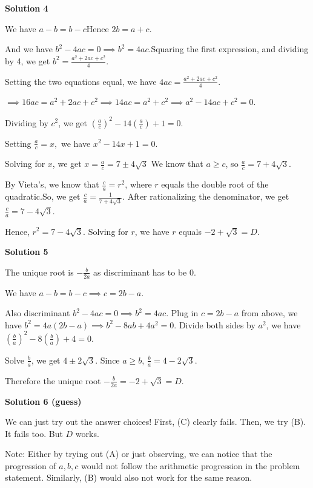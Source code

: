 \begin{enumerate}
\textbf{Solution 4}

We have $a-b=b-c$Hence $2b=a+c$.

 And we have $b^2-4ac=0\implies b^2=4ac$.Squaring the first expression, and dividing by 4, we get $b^2=\frac{a^2+2ac+c^2}{4}$.

 Setting the two equations equal, we have $4ac=\frac{a^2+2ac+c^2}{4}$.

 $\implies 16ac=a^2+2ac+c^2\implies 14ac=a^2+c^2\implies a^2-14ac+c^2=0$.

 Dividing by $c^2$, we get $(\frac{a}{c})^2-14(\frac{a}{c})+1=0$. 

 Setting $\frac{a}{c}=x,$ we have $x^2-14x+1=0.$ 

 Solving for $x$, we get $x=\frac{a}{c}=7 \pm 4\sqrt3$ We know that $a \ge c$, so $\frac{a}{c}=7+4\sqrt3$.

 By Vieta's, we know that $\frac{c}{a}=r^2$, where $r$ equals the double root of the quadratic.So, we get $\frac{c}{a}=\frac{1}{7 + 4\sqrt3}$. After rationalizing the denominator, we get $\frac{c}{a} = 7- 4\sqrt 3$.

 Hence, $r^2=7-4\sqrt3$. Solving for $r$, we have $r$ equals $-2+\sqrt3=\boxed{D}$.

 



\textbf{Solution 5}

The unique root is $-\frac {b} {2a}$ as discriminant has to be 0.

 We have $a-b=b-c \implies c=2b-a$.

 Also discriminant $b^2-4ac=0 \implies b^2=4ac$. Plug in $c=2b-a$ from above, we have $b^2=4a(2b-a) \implies b^2-8ab+4a^2=0$. Divide both sides by $a^2$,  we have $(\frac{b}{a})^2-8(\frac{b}{a})+4=0$.

 Solve $\frac{b}{a}$, we get $4\pm2\sqrt {3}$. Since $a \ge b$, $\frac{b}{a}=4-2\sqrt {3}$. 

 Therefore the unique root $-\frac{b}{2a} = -2+\sqrt3=\boxed{D}$.

 



\textbf{Solution 6 (guess)}

We can just try out the answer choices! First, (C) clearly fails. Then, we try (B). It fails too. But $\boxed{D}$ works.

 Note: Either by trying out (A) or just observing, we can notice that the progression of $a,b,c$ would not follow the arithmetic progression in the problem statement. Similarly, (B) would also not work for the same reason.


\end{enumerate}
